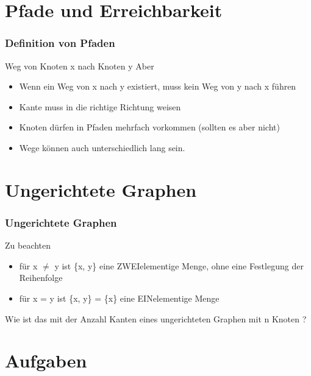\documentclass{beamer}
\begin{document}
\section{Pfade und Erreichbarkeit}

\begin{frame}
	\frametitle{Definition von Pfaden}
	\begin{block}{Weg von Knoten x nach Knoten y}
		Aber
		\begin{itemize}
			\item Wenn ein Weg von x nach y existiert, muss kein Weg von y nach x f\"uhren
			\item Kante muss in die richtige Richtung weisen
			\item Knoten d\"urfen in Pfaden mehrfach vorkommen (sollten es aber nicht)
			\item Wege k\"onnen auch unterschiedlich lang sein.
		\end{itemize}
	\end{block}
\end{frame}

\section{Ungerichtete Graphen}

\begin{frame}
	\frametitle{Ungerichtete Graphen}
	\begin{block}{Zu beachten}
		\begin{itemize}
			\item f\"ur x $\ne$ y ist \{x, y\} eine ZWEIelementige Menge, ohne eine Festlegung der Reihenfolge
			\item f\"ur x = y ist \{x, y\} = \{x\} eine EINelementige Menge
		\end{itemize}
	\end{block}
	\begin{example}{ }
		Wie ist das mit der Anzahl Kanten eines ungerichteten Graphen mit n Knoten ? 
	
	\end{example}
\end{frame}

\section{Aufgaben}
\end{document}
